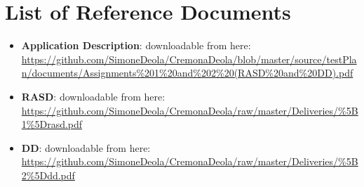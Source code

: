 \documentclass[../../../../testPlan.tex]{subfiles}
\begin{document}
	\section{List of Reference Documents}

		\begin{itemize}
			\item \textbf{Application Description}: downloadable from here: \url{https://github.com/SimoneDeola/CremonaDeola/blob/master/source/testPlan/documents/Assignments%201%20and%202%20(RASD%20and%20DD).pdf}

			\item \textbf{RASD}: downloadable from here: \url{https://github.com/SimoneDeola/CremonaDeola/raw/master/Deliveries/%5B1%5Drasd.pdf}

			\item \textbf{DD}: downloadable from here: \url{https://github.com/SimoneDeola/CremonaDeola/raw/master/Deliveries/%5B2%5Ddd.pdf}
		\end{itemize}
\end{document}
